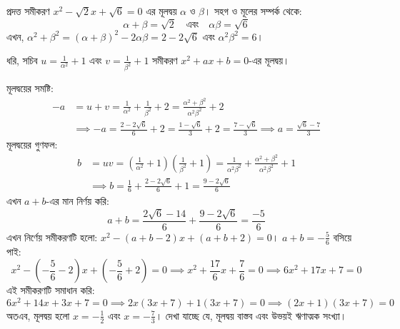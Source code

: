 \documentclass[12pt, a4paper]{article}
\begin{document}
\begin{tcolorbox}[solutionbox={সমাধান (Solution)}]
    \noindent
    প্রদত্ত সমীকরণ $x^2 - \sqrt{2}x + \sqrt{6} = 0$ এর মূলদ্বয় $\alpha$ ও $\beta$। সহগ ও মূলের সম্পর্ক থেকে:
    \[ \alpha+\beta = \sqrt{2} \quad \text{এবং} \quad \alpha\beta = \sqrt{6} \]
    এখন, $\alpha^2+\beta^2 = (\alpha+\beta)^2 - 2\alpha\beta = 2 - 2\sqrt{6}$ এবং $\alpha^2\beta^2 = 6$।
    
    ধরি, সচিব $u = \frac{1}{\alpha^2}+1$ এবং $v = \frac{1}{\beta^2}+1$ সমীকরণ $x^2 + ax + b = 0$-এর মূলদ্বয়।
    
    মূলদ্বয়ের সমষ্টি:
    \begin{align*}
        -a &= u + v = \frac{1}{\alpha^2} + \frac{1}{\beta^2} + 2 = \frac{\alpha^2+\beta^2}{\alpha^2\beta^2} + 2 \\
        &\implies -a = \frac{2-2\sqrt{6}}{6} + 2 = \frac{1-\sqrt{6}}{3} + 2 = \frac{7-\sqrt{6}}{3} \implies a = \frac{\sqrt{6}-7}{3}
    \end{align*}
    মূলদ্বয়ের গুণফল:
    \begin{align*}
        b &= uv = \left(\frac{1}{\alpha^2}+1\right)\left(\frac{1}{\beta^2}+1\right) = \frac{1}{\alpha^2\beta^2} + \frac{\alpha^2+\beta^2}{\alpha^2\beta^2} + 1 \\
        &\implies b = \frac{1}{6} + \frac{2-2\sqrt{6}}{6} + 1 = \frac{9-2\sqrt{6}}{6}
    \end{align*}
    এখন $a+b$-এর মান নির্ণয় করি:
    \[ a+b = \frac{2\sqrt{6}-14}{6} + \frac{9-2\sqrt{6}}{6} = \frac{-5}{6} \]
    এখন নির্ণেয় সমীকরণটি হলো: $x^2 - (a+b-2)x + (a+b+2) = 0$। $a+b = -\frac{5}{6}$ বসিয়ে পাই:
    \[ x^2 - \left(-\frac{5}{6}-2\right)x + \left(-\frac{5}{6}+2\right) = 0 \implies x^2 + \frac{17}{6}x + \frac{7}{6} = 0 \implies 6x^2 + 17x + 7 = 0 \]
    এই সমীকরণটি সমাধান করি:
    \[ 6x^2 + 14x + 3x + 7 = 0 \implies 2x(3x+7) + 1(3x+7) = 0 \implies (2x+1)(3x+7) = 0 \]
    অতএব, মূলদ্বয় হলো $x = -\frac{1}{2}$ এবং $x = -\frac{7}{3}$। দেখা যাচ্ছে যে, মূলদ্বয় বাস্তব এবং উভয়ই ঋণাত্মক সংখ্যা।
\end{tcolorbox}

\vspace{1em}
\end{document}
